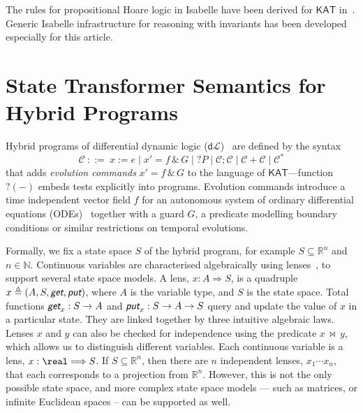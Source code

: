 \documentclass[envcountsame]{llncs}
\newcommand{\KAT}{\mathsf{KAT}}
\newcommand{\dL}{\mathsf{d}\mathcal{L}}
\newcommand{\reals}{\mathbb{R}}
\newcommand{\defs}{\triangleq}
\newcommand\notein[3]{\todo[inline,linecolor=orange!80!black,backgroundcolor=#2!20]{#1: #3}%
}
\newcommand{\gin}[1]{\notein{{\bf GS}}{gcolor}{#1}}
\newcommand{\lput}{\textit{\textsf{put}}}
\newcommand{\lget}{\textit{\textsf{get}}}
\newcommand{\lto}{\Longrightarrow}
\newcommand{\lindep}{\mathop{\,\bowtie\,}}
\begin{document}
The rules for propositional Hoare logic in Isabelle have been derived
for $\KAT$ in~\cite{afp:kat,afp:vericomp}. Generic Isabelle
infrastructure for reasoning with invariants has been developed
especially for this article.



\section{State Transformer Semantics for Hybrid
  Programs}\label{sec:sta-hybrid}

\gin{Simon: add some paras on lenses.}

Hybrid programs of differential dynamic logic ($\dL$)~\cite{Platzer18}
are defined by the syntax
\begin{equation*}
\mathcal{C}\ ::= \ x:=e \mid x' = f \, \&\, G \mid ?P\mid \mathcal{C};\mathcal{C}\mid \mathcal{C}+\mathcal{C}\mid \mathcal{C}^*
\end{equation*}
that adds \emph{evolution commands} $x' = f \, \&\, G$ to the language
of $\KAT$---function $?(-)$ embeds tests explicitly into programs.
Evolution commands introduce a time independent vector field $f$ for
an autonomous system of ordinary differential equations
(ODEs)~\cite{Teschl12} together with a guard $G$, a predicate
modelling boundary conditions or similar restrictions on temporal
evolutions. %

Formally, we fix a state space $S$ of the hybrid program, for example
$S\subseteq \reals^n$ and $n\in\mathbb{N}$. Continuous variables are characterised
algebraically using lenses~\cite{FosterZW16}, to support several state space
models. A lens, $x : A \lto S$, is a quadruple $x \defs (A, S, \lget, \lput)$, where
$A$ is the variable type, and $S$ is the state space. Total functions
$\lget_x : S \to A$ and $\lput_x : S \to A \to S$ query and update the value of $x$
in a particular state. They are linked together by three intuitive algebraic
laws. Lenses $x$ and $y$ can also be checked for independence using the predicate
$x \lindep y$, which allows us to distinguish different variables. Each continuous
variable is a lens, $x : \real \lto S$. If $S \subseteq \reals^n$, then there are
$n$ independent lenses, $x_1 \cdots x_n$, that each corresponds to a projection from
$\reals^n$. However, this is not the only possible state space, and more complex
state space models --- such as matrices, or infinite Euclidean spaces -- can be
supported as well.
\end{document}
